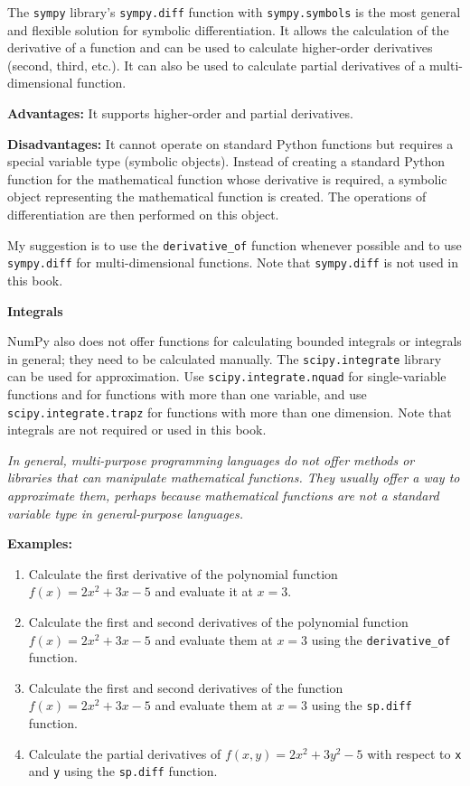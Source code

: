 \documentclass[11pt]{article}
\begin{document}
The \texttt{sympy} library's \texttt{sympy.diff} function with
\texttt{sympy.symbols} is the most general and flexible solution for
symbolic differentiation. It allows the calculation of the derivative of
a function and can be used to calculate higher-order derivatives
(second, third, etc.). It can also be used to calculate partial
derivatives of a multi-dimensional function.

\textbf{Advantages:} It supports higher-order and partial derivatives.

\textbf{Disadvantages:} It cannot operate on standard Python functions
but requires a special variable type (symbolic objects). Instead of
creating a standard Python function for the mathematical function whose
derivative is required, a symbolic object representing the mathematical
function is created. The operations of differentiation are then
performed on this object.

My suggestion is to use the \texttt{derivative\_of} function whenever
possible and to use \texttt{sympy.diff} for multi-dimensional functions.
Note that \texttt{sympy.diff} is not used in this book.

\textbf{Integrals}

NumPy also does not offer functions for calculating bounded integrals or
integrals in general; they need to be calculated manually. The
\texttt{scipy.integrate} library can be used for approximation. Use
\texttt{scipy.integrate.nquad} for single-variable functions and for
functions with more than one variable, and use
\texttt{scipy.integrate.trapz} for functions with more than one
dimension. Note that integrals are not required or used in this book.

\emph{In general, multi-purpose programming languages do not offer
methods or libraries that can manipulate mathematical functions. They
usually offer a way to approximate them, perhaps because mathematical
functions are not a standard variable type in general-purpose
languages.}

\textbf{Examples:}

\begin{enumerate}
\def\labelenumi{\arabic{enumi}.}
\item
  Calculate the first derivative of the polynomial function
  \(f(x) = 2x^2 + 3x - 5\) and evaluate it at \(x = 3\).
\item
  Calculate the first and second derivatives of the polynomial function
  \(f(x) = 2x^2 + 3x - 5\) and evaluate them at \(x = 3\) using the
  \texttt{derivative\_of} function.
\item
  Calculate the first and second derivatives of the function
  \(f(x) = 2x^2 + 3x - 5\) and evaluate them at \(x = 3\) using the
  \texttt{sp.diff} function.
\item
  Calculate the partial derivatives of \(f(x, y) = 2x^2 + 3y^2 - 5\)
  with respect to \texttt{x} and \texttt{y} using the \texttt{sp.diff}
  function.
\end{enumerate}
\end{document}
